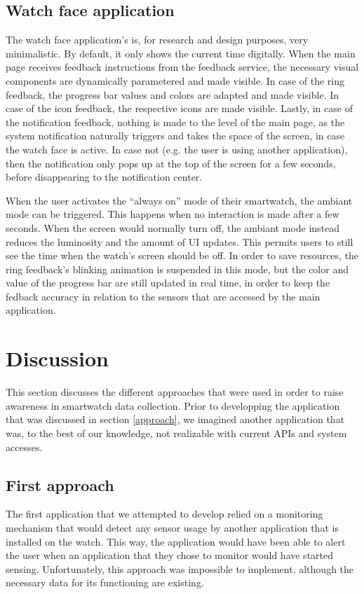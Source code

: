 \documentclass[conference, a4paper, 10pt, twocolumn]{IEEEtran}
\begin{document}
\subsection{Watch face application}
The watch face application's is, for research and design purposes, very minimalistic. By default, it only shows the current time digitally. When the main page receives feedback instructions from the feedback service, the necessary visual components are dynamically parametered and made visible. In case of the ring feedback, the progress bar values and colors are adapted and made visible. In case of the icon feedback, the respective icons are made visible. Lastly, in case of the notification feedback, nothing is made to the level of the main page, as the system notification naturally triggers and takes the space of the screen, in case the watch face is active. In case not (e.g. the user is using another application), then the notification only pops up at the top of the screen for a few seconds, before disappearing to the notification center. 

When the user activates the ``always on'' mode of their smartwatch, the ambiant mode can be triggered. This happens when no interaction is made after a few seconds. When the screen would normally turn off, the ambiant mode instead reduces the luminosity and the amount of \ac{UI} updates. This permits users to still see the time when the watch's screen should be off. In order to save resources, the ring feedback's blinking animation is suspended in this mode, but the color and value of the progress bar are still updated in real time, in order to keep the fedback accuracy in relation to the sensors that are accessed by the main application.

\section{Discussion}\label{discussion}
This section discusses the different approaches that were used in order to raise awareness in smartwatch data collection. Prior to developping the application that was discussed in section \ref{approach}, we imagined another application that was, to the best of our knowledge, not realizable with current \acp{API} and system accesses.  

\subsection{First approach}
The first application that we attempted to develop relied on a monitoring mechanism that would detect any sensor usage by another application that is installed on the watch. This way, the application would have been able to alert the user when an application that they chose to monitor would have started sensing. Unfortunately, this approach was impossible to implement, although the necessary data for its functioning are existing.
\end{document}
